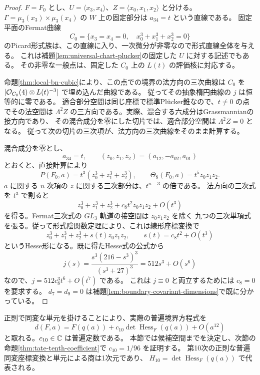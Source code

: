 \begin{proof}
$F=F_0$ とし、$U=\langle x_3,x_4\rangle$、$Z=\langle x_0,x_1,x_2\rangle$ と分ける。
$\Gamma=\mu_3(x_3)\times\mu_3(x_4)$ の $W$ 上の固定部分は $a_{34}=t$ という直線である。
固定平面のFermat曲線
\[
 C_0=\{x_3=x_4=0,\quad x_0^3+x_1^3+x_2^3=0\}
\]
のPicard形式族は、この直線に入り、一次微分が非零なので形式直線全体を与える。
これは補題\ref{lem:universal-chart-plucker}の固定した $U$ に対する記述でもある。
その非零な一般点は、固定した $C_0$ 上の $L(t)$ の評価核に対応する。

命題\ref{thm:local-bn-cubic}により、この点での境界の法方向の三次曲線は
$C_0$ を $|\mathcal O_{C_0}(4)\otimes L(t)^{-3}|$ で埋め込んだ曲線である。
従ってその抽象楕円曲線の $j$ は恒等的に零である。
適合部分空間は同じ座標で標準Pl\"ucker錐なので、$t\ne0$ の点でその法空間は
$\Lambda^2Z$ の三方向である。実際、混合する六成分はGrassmannianの接方向であり、
その混合成分を零にした切片では、適合部分空間は $\Lambda^2Z=0$ となる。
従って次の切片の三次項が、法方向の三次曲線をそのまま計算する。

混合成分を零とし、
\[
 a_{34}=t,\qquad (z_0,z_1,z_2)=(a_{12},-a_{02},a_{01})
\]
とおくと、直接計算により
\begin{equation}\label{eq:boundary-hesse-slice}
 P(F_0,a)=t^3(z_0^3+z_1^3+z_2^3),\qquad
 \Theta_8(F_0,a)=t^5z_0z_1z_2.
\end{equation}
$a$ に関する $n$ 次項の $z$ に関する三次部分は、$t^{n-3}$ の倍である。
法方向の三次式を $t^3$ で割ると
\[
 z_0^3+z_1^3+z_2^3+c_8t^2z_0z_1z_2+O(t^3)
\]
を得る。Fermat三次式の $GL_3$ 軌道の接空間は $z_0z_1z_2$ を除く
九つの三次単項式を張る。従って形式陰関数定理により、これは線形座標変換で
\[
 z_0^3+z_1^3+z_2^3+s(t)z_0z_1z_2,
 \qquad s(t)=c_8t^2+O(t^3)
\]
というHesse形になる。既に得たHesse式の公式から
\[
 j(s)=\frac{s^3(216-s^3)^3}{(s^3+27)^3}
     =512s^3+O(s^6)
\]
なので、$j=512c_8^3t^6+O(t^7)$ である。
これは $j\equiv0$ と両立するためには $c_8=0$ を要求する。
$d_7=d_9=0$ は補題\ref{lem:boundary-covariant-dimensions}で既に分かっている。
\end{proof}

\begin{theorem}[第11次までの標準形と残る普遍係数]\label{thm:boundary-eleven-jet}
正則で同変な単元を掛けることにより、実際の普遍境界方程式を
\begin{equation}\label{eq:boundary-eleven-jet}
 d(F,a)=F(q(a))+
 c_{10}\det\operatorname{Hess}_F(q(a))+O(a^{12})
\end{equation}
と取れる。$c_{10}\in\mathbb C$ は普遍定数である。
本節では候補空間までを決定し、次節の命題\ref{thm:tate-tenth-coefficient}で
$c_{10}=1/96$ を証明する。
第10次の正則な普遍同変座標変換と単元による商は1次元であり、
$H_{10}=\det\operatorname{Hess}_F(q(a))$ で代表される。
\end{theorem}

